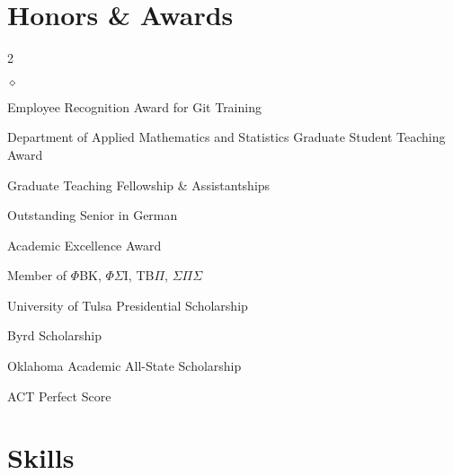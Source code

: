 \documentclass[margin,line,pifont,palatino,10pt]{res}
\begin{document}
\begin{resume}
\vspace{1.5mm}
\section{\sc Honors \& Awards}
\vspace{0ex}
\begin{multicols}{2}
\raggedright
\begin{list}{$\diamond$}{\leftmargin=0.15in}
\item Employee Recognition Award for Git Training
\item Department of Applied Mathematics and Statistics Graduate Student Teaching Award
\item Graduate Teaching Fellowship \& Assistantships
\item Outstanding Senior in German
\item Academic Excellence Award
\item Member of $\Phi$BK, $\Phi\Sigma$I, TB$\Pi$, $\Sigma\Pi\Sigma$
\item University of Tulsa Presidential Scholarship
\item Byrd Scholarship
\item Oklahoma Academic All-State Scholarship
\item ACT Perfect Score
\end{list}
\end{multicols}






\vspace{1.5mm}
\section{\sc Skills}


\end{resume}
\end{document}
